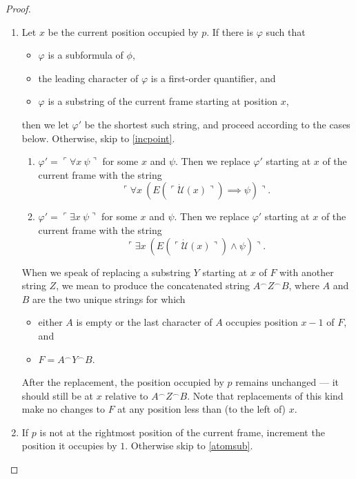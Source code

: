 \documentclass[12pt, twoside]{memoir}
\numberwithin{equation}{section}
\theoremstyle{definition}
\theoremstyle{remark}
\theoremstyle{definition}
\theoremstyle{definition}
\theoremstyle{definition}
\theoremstyle{remark}
\begin{document}
\begin{proof}
\begin{enumerate}[label=(\arabic*)]
\begin{enumerate}[label=(\Alph*)]
        \item\label{casesub} Let $x$ be the current position occupied by $p$. If there is $\varphi$ such that 
        \begin{itemize}
            \item $\varphi$ is a subformula of $\phi$, 
            \item the leading character of $\varphi$ is a first-order quantifier, and
            \item $\varphi$ is a substring of the current frame starting at position $x$,
        \end{itemize}
        then we let $\varphi'$ be the shortest such string, and proceed according to the cases below. Otherwise, skip to \ref{incpoint}.
        \begin{enumerate}[label=Case \arabic*:, leftmargin=50pt]
            \item $\varphi' = \ulcorner \forall x \ \psi \urcorner$ for some $x$ and $\psi$. Then we replace $\varphi'$ starting at $x$ of the current frame with the string $$\ulcorner \forall x \ (E(\ulcorner \dot{\mathcal{U}}(x) \urcorner) \implies \psi) \urcorner.$$
            \item $\varphi' = \ulcorner \exists x \ \psi \urcorner$ for some $x$ and $\psi$. Then we replace $\varphi'$ starting at $x$ of the current frame with the string $$\ulcorner \exists x \ (E(\ulcorner \dot{\mathcal{U}}(x) \urcorner) \wedge \psi) \urcorner.$$
        \end{enumerate}

        When we speak of replacing a substring $Y$ starting at $x$ of $F$ with another string $Z$, we mean to produce the concatenated string $A^\frown Z^\frown B$, where $A$ and $B$ are the two unique strings for which 
        \begin{itemize}
            \item either $A$ is empty or the last character of $A$ occupies position $x-1$ of $F$, and
            \item $F = A^\frown Y^\frown B$. 
        \end{itemize}
        After the replacement, the position occupied by $p$ remains unchanged --- it should still be at $x$ relative to $A^\frown Z^\frown B$. Note that replacements of this kind make no changes to $F$ at any position less than (to the left of) $x$. 
        
        \item\label{incpoint} If $p$ is not at the rightmost position of the current frame, increment the position it occupies by $1$. Otherwise skip to \ref{atomsub}.
        

\end{enumerate}
\end{enumerate}
\end{proof}
\end{document}

